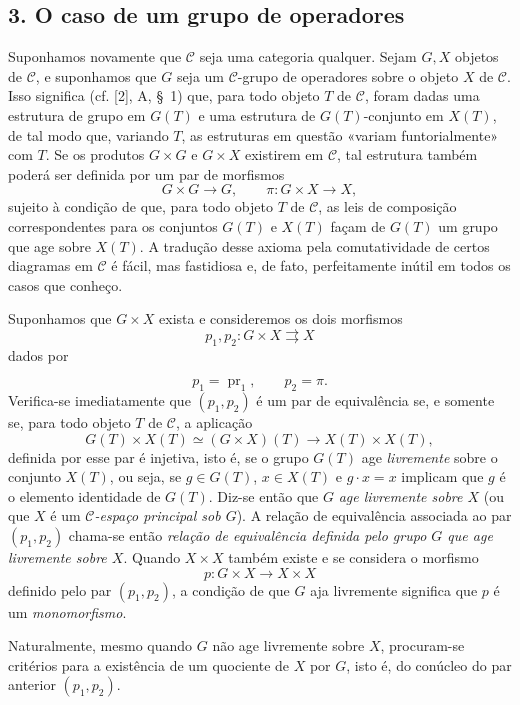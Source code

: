 \documentclass[11pt,twoside,openany]{book}
\numberwithin{equation}{section}
\newcommand{\src}[1]{%
  \phantomsection\hypertarget{src:#1}{}%
  \marginpar{\raggedleft\footnotesize\sffamily #1}%
}
\theoremstyle{plain}
\theoremstyle{definition}
\theoremstyle{remark}
\newcommand{\FgaUnitKey}{frontmatter}
\renewcommand{\src}[1]{%
  \phantomsection\hypertarget{src:\FgaUnitKey:#1}{}%
  \marginpar{\raggedleft\footnotesize\sffamily #1}%
}
\begin{document}
\subsection*{3. O caso de um grupo de operadores}

Suponhamos novamente que $\mathcal C$ seja uma categoria qualquer. Sejam
$G,X$ objetos de $\mathcal C$, e suponhamos que $G$ seja um
$\mathcal C$-grupo de operadores sobre o objeto $X$ de $\mathcal C$. Isso
significa (cf. [2], A, \S~1) que, para todo objeto $T$ de $\mathcal C$, foram
dadas uma estrutura de grupo em $G(T)$ e uma estrutura de $G(T)$-conjunto em
$X(T)$, de tal modo que, variando $T$, as estruturas em questão «variam
funtorialmente» com $T$. Se os produtos $G\times G$ e $G\times X$ existirem
em $\mathcal C$, tal estrutura também poderá ser definida por um par de
morfismos
\[
  G\times G\longrightarrow G,
  \qquad \pi:G\times X\longrightarrow X,
\]
sujeito à condição de que, para todo objeto $T$ de $\mathcal C$, as leis de
composição correspondentes para os conjuntos $G(T)$ e $X(T)$ façam de $G(T)$
um grupo que age sobre $X(T)$. A tradução desse axioma pela comutatividade de
certos diagramas em $\mathcal C$ é fácil, mas fastidiosa e, de fato,
perfeitamente inútil em todos os casos que conheço.

Suponhamos que $G\times X$ exista e consideremos os dois morfismos
\[
  p_1,p_2:G\times X\rightrightarrows X
\]
dados por
\src{105}
\[
  p_1=\operatorname{pr}_1,\qquad p_2=\pi.
\]
Verifica-se imediatamente que $(p_1,p_2)$ é um par de equivalência se, e
somente se, para todo objeto $T$ de $\mathcal C$, a aplicação
\[
  G(T)\times X(T)\simeq(G\times X)(T)
  \longrightarrow X(T)\times X(T),
\]
definida por esse par é injetiva, isto é, se o grupo $G(T)$ age
\emph{livremente} sobre o conjunto $X(T)$, ou seja, se $g\in G(T)$,
$x\in X(T)$ e $g\cdot x=x$ implicam que $g$ é o elemento identidade de
$G(T)$. Diz-se então que $G$ \emph{age livremente sobre $X$} (ou que $X$ é um
\emph{$\mathcal C$-espaço principal sob $G$}). A relação de equivalência
associada ao par $(p_1,p_2)$ chama-se então \emph{relação de equivalência
definida pelo grupo $G$ que age livremente sobre $X$}. Quando $X\times X$
também existe e se considera o morfismo
\[
  p:G\times X\longrightarrow X\times X
\]
definido pelo par $(p_1,p_2)$, a condição de que $G$ aja livremente significa
que $p$ é um \emph{monomorfismo}.

Naturalmente, mesmo quando $G$ não age livremente sobre $X$, procuram-se
critérios para a existência de um quociente de $X$ por $G$, isto é, do
conúcleo do par anterior $(p_1,p_2)$.
\end{document}
